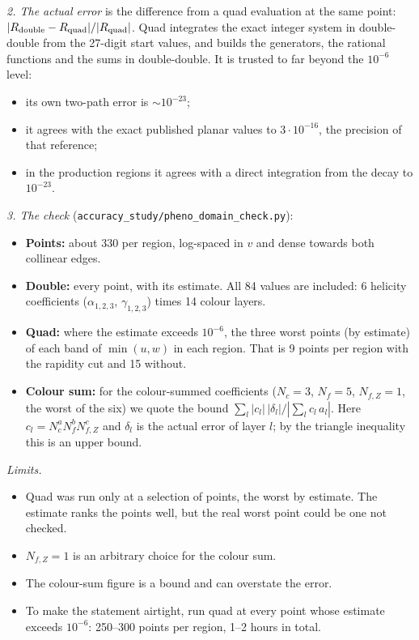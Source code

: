 \documentclass[11pt]{article}
\begin{document}
\emph{2. The actual error} is the difference from a quad evaluation at the same point:
$|R_{\rm double}-R_{\rm quad}|/|R_{\rm quad}|$. Quad integrates the exact integer system in double-double from the
27-digit start values, and builds the generators, the rational functions and the sums in double-double. It is trusted
to far beyond the $10^{-6}$ level:
\begin{itemize}
\item its own two-path error is $\sim10^{-23}$;
\item it agrees with the exact published planar values to $3\cdot10^{-16}$, the precision of that reference;
\item in the production regions it agrees with a direct integration from the decay to $10^{-23}$.
\end{itemize}

\emph{3. The check} (\texttt{accuracy\_study/pheno\_domain\_check.py}):
\begin{itemize}
\item \textbf{Points:} about 330 per region, log-spaced in $v$ and dense towards both collinear edges.
\item \textbf{Double:} every point, with its estimate. All 84 values are included: 6 helicity coefficients
  ($\alpha_{1,2,3}$, $\gamma_{1,2,3}$) times 14 colour layers.
\item \textbf{Quad:} where the estimate exceeds $10^{-6}$, the three worst points (by estimate) of each band of
  $\min(u,w)$ in each region. That is 9 points per region with the rapidity cut and 15 without.
\item \textbf{Colour sum:} for the colour-summed coefficients ($N_c=3$, $N_f=5$, $N_{f,Z}=1$, the worst of the six)
  we quote the bound $\sum_l|c_l|\,|\delta_l|/|\sum_l c_l\,a_l|$. Here $c_l=N_c^aN_f^bN_{f,Z}^c$ and $\delta_l$ is
  the actual error of layer $l$; by the triangle inequality this is an upper bound.
\end{itemize}

\emph{Limits.}
\begin{itemize}
\item Quad was run only at a selection of points, the worst by estimate. The estimate ranks the points well, but the
  real worst point could be one not checked.
\item $N_{f,Z}=1$ is an arbitrary choice for the colour sum.
\item The colour-sum figure is a bound and can overstate the error.
\item To make the statement airtight, run quad at every point whose estimate exceeds $10^{-6}$: 250--300 points per
  region, 1--2 hours in total.
\end{itemize}
\end{document}
